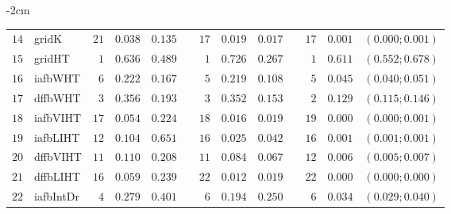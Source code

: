 \begin{table*}[!htbp]
\begin{adjustwidth*}{}{-2cm}
\begin{tabular}{@{}rlrrrrrrrrrcc@{}}
\footnotesize{$14$} & \footnotesize{gridK    } & \footnotesize{$21$} & \footnotesize{$0.038$} & \footnotesize{$0.135$} && \footnotesize{$17$} & \footnotesize{$0.019$} & \footnotesize{$0.017$} && \footnotesize{$17$} & \footnotesize{$0.001$} & \footnotesize{$(0.000;0.001)$} \\
\footnotesize{$15$} & \footnotesize{gridHT   } & \footnotesize{$1 $} & \footnotesize{$0.636$} & \footnotesize{$0.489$} && \footnotesize{$1 $} & \footnotesize{$0.726$} & \footnotesize{$0.267$} && \footnotesize{$1 $} & \footnotesize{$0.611$} & \footnotesize{$(0.552;0.678)$} \\
\footnotesize{$16$} & \footnotesize{iafbWHT  } & \footnotesize{$6 $} & \footnotesize{$0.222$} & \footnotesize{$0.167$} && \footnotesize{$5 $} & \footnotesize{$0.219$} & \footnotesize{$0.108$} && \footnotesize{$5 $} & \footnotesize{$0.045$} & \footnotesize{$(0.040;0.051)$} \\
\footnotesize{$17$} & \footnotesize{dffbWHT  } & \footnotesize{$3 $} & \footnotesize{$0.356$} & \footnotesize{$0.193$} && \footnotesize{$3 $} & \footnotesize{$0.352$} & \footnotesize{$0.153$} && \footnotesize{$2 $} & \footnotesize{$0.129$} & \footnotesize{$(0.115;0.146)$} \\
\footnotesize{$18$} & \footnotesize{iafbVIHT } & \footnotesize{$17$} & \footnotesize{$0.054$} & \footnotesize{$0.224$} && \footnotesize{$18$} & \footnotesize{$0.016$} & \footnotesize{$0.019$} && \footnotesize{$19$} & \footnotesize{$0.000$} & \footnotesize{$(0.000;0.001)$} \\
\footnotesize{$19$} & \footnotesize{iafbLIHT } & \footnotesize{$12$} & \footnotesize{$0.104$} & \footnotesize{$0.651$} && \footnotesize{$16$} & \footnotesize{$0.025$} & \footnotesize{$0.042$} && \footnotesize{$16$} & \footnotesize{$0.001$} & \footnotesize{$(0.001;0.001)$} \\
\footnotesize{$20$} & \footnotesize{dffbVIHT } & \footnotesize{$11$} & \footnotesize{$0.110$} & \footnotesize{$0.208$} && \footnotesize{$11$} & \footnotesize{$0.084$} & \footnotesize{$0.067$} && \footnotesize{$12$} & \footnotesize{$0.006$} & \footnotesize{$(0.005;0.007)$} \\
\footnotesize{$21$} & \footnotesize{dffbLIHT } & \footnotesize{$16$} & \footnotesize{$0.059$} & \footnotesize{$0.239$} && \footnotesize{$22$} & \footnotesize{$0.012$} & \footnotesize{$0.019$} && \footnotesize{$22$} & \footnotesize{$0.000$} & \footnotesize{$(0.000;0.000)$} \\
\footnotesize{$22$} & \footnotesize{iafbIntDr} & \footnotesize{$4 $} & \footnotesize{$0.279$} & \footnotesize{$0.401$} && \footnotesize{$6 $} & \footnotesize{$0.194$} & \footnotesize{$0.250$} && \footnotesize{$6 $} & \footnotesize{$0.034$} & \footnotesize{$(0.029;0.040)$} \\

\end{tabular}
\end{adjustwidth*}
\end{table*}
